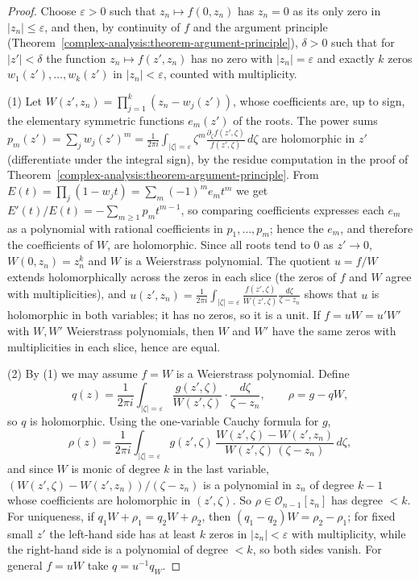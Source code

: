 \begin{proof}
Choose $\varepsilon > 0$ such that $z_n \mapsto f(0, z_n)$ has $z_n = 0$ as its only zero in $|z_n| \leq \varepsilon$, and then, by continuity of $f$ and the argument principle
(Theorem~\ref{complex-analysis:theorem-argument-principle}), $\delta > 0$ such that for $|z'| < \delta$ the function $z_n \mapsto f(z', z_n)$ has no zero with $|z_n| = \varepsilon$ and exactly $k$ zeros
$w_1(z'), \ldots, w_k(z')$ in $|z_n| < \varepsilon$, counted with multiplicity.

(1) Let $W(z', z_n) = \prod_{j=1}^k(z_n - w_j(z'))$, whose coefficients are, up to sign, the elementary symmetric functions $e_m(z')$ of the roots. The power sums
$p_m(z') = \sum_jw_j(z')^m = \frac{1}{2\pi i}\int_{|\zeta| = \varepsilon}\zeta^m\frac{\partial_\zeta f(z', \zeta)}{f(z', \zeta)}\,d\zeta$ are holomorphic in $z'$ (differentiate under the integral sign), by the
residue computation in the proof of Theorem~\ref{complex-analysis:theorem-argument-principle}. From $E(t) = \prod_j(1 - w_jt) = \sum_m(-1)^me_mt^m$ we get
$E'(t)/E(t) = -\sum_{m \geq 1}p_mt^{m-1}$, so comparing coefficients expresses each $e_m$ as a polynomial with rational coefficients in $p_1, \ldots, p_m$; hence the $e_m$, and therefore the coefficients of
$W$, are holomorphic. Since all roots tend to $0$ as $z' \to 0$, $W(0, z_n) = z_n^k$ and $W$ is a Weierstrass polynomial. The quotient $u = f/W$ extends holomorphically across the zeros in each slice
(the zeros of $f$ and $W$ agree with multiplicities), and
$u(z', z_n) = \frac{1}{2\pi i}\int_{|\zeta| = \varepsilon}\frac{f(z', \zeta)}{W(z', \zeta)}\frac{d\zeta}{\zeta - z_n}$ shows that $u$ is holomorphic in both variables; it has no zeros, so it is a unit. If
$f = uW = u'W'$ with $W, W'$ Weierstrass polynomials, then $W$ and $W'$ have the same zeros with multiplicities in each slice, hence are equal.

(2) By (1) we may assume $f = W$ is a Weierstrass polynomial. Define
\[
q(z) = \frac{1}{2\pi i}\int_{|\zeta| = \varepsilon}\frac{g(z', \zeta)}{W(z', \zeta)}\cdot\frac{d\zeta}{\zeta - z_n}, \qquad \rho = g - qW,
\]
so $q$ is holomorphic. Using the one-variable Cauchy formula for $g$,
\[
\rho(z) = \frac{1}{2\pi i}\int_{|\zeta| = \varepsilon}g(z', \zeta)\,\frac{W(z', \zeta) - W(z', z_n)}{W(z', \zeta)\,(\zeta - z_n)}\,d\zeta,
\]
and since $W$ is monic of degree $k$ in the last variable, $(W(z', \zeta) - W(z', z_n))/(\zeta - z_n)$ is a polynomial in $z_n$ of degree $k - 1$ whose coefficients are holomorphic in $(z', \zeta)$. So
$\rho \in \mathcal{O}_{n-1}[z_n]$ has degree $< k$. For uniqueness, if $q_1W + \rho_1 = q_2W + \rho_2$, then $(q_1 - q_2)W = \rho_2 - \rho_1$; for fixed small $z'$ the left-hand side has at least $k$ zeros in
$|z_n| < \varepsilon$ with multiplicity, while the right-hand side is a polynomial of degree $< k$, so both sides vanish. For general $f = uW$ take $q = u^{-1}q_W$.
\end{proof}

